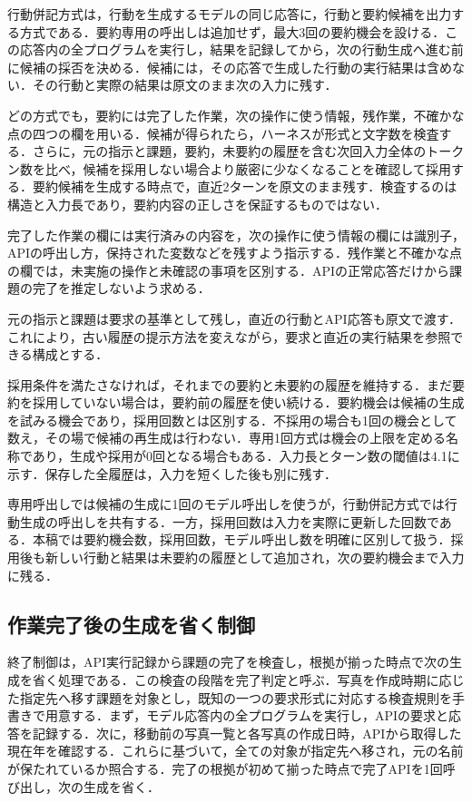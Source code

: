 \documentclass[letter]{ieicej}
\begin{document}
行動併記方式は，行動を生成するモデルの同じ応答に，行動と要約候補を出力する方式である．要約専用の呼出しは追加せず，最大3回の要約機会を設ける．この応答内の全プログラムを実行し，結果を記録してから，次の行動生成へ進む前に候補の採否を決める．候補には，その応答で生成した行動の実行結果は含めない．その行動と実際の結果は原文のまま次の入力に残す．

どの方式でも，要約には完了した作業，次の操作に使う情報，残作業，不確かな点の四つの欄を用いる．候補が得られたら，ハーネスが形式と文字数を検査する．さらに，元の指示と課題，要約，未要約の履歴を含む次回入力全体のトークン数を比べ，候補を採用しない場合より厳密に少なくなることを確認して採用する．要約候補を生成する時点で，直近2ターンを原文のまま残す．検査するのは構造と入力長であり，要約内容の正しさを保証するものではない．

完了した作業の欄には実行済みの内容を，次の操作に使う情報の欄には識別子，APIの呼出し方，保持された変数などを残すよう指示する．残作業と不確かな点の欄では，未実施の操作と未確認の事項を区別する．APIの正常応答だけから課題の完了を推定しないよう求める．

元の指示と課題は要求の基準として残し，直近の行動とAPI応答も原文で渡す．これにより，古い履歴の提示方法を変えながら，要求と直近の実行結果を参照できる構成とする．

採用条件を満たさなければ，それまでの要約と未要約の履歴を維持する．まだ要約を採用していない場合は，要約前の履歴を使い続ける．要約機会は候補の生成を試みる機会であり，採用回数とは区別する．不採用の場合も1回の機会として数え，その場で候補の再生成は行わない．専用1回方式は機会の上限を定める名称であり，生成や採用が0回となる場合もある．入力長とターン数の閾値は4.1に示す．保存した全履歴は，入力を短くした後も別に残す．

専用呼出しでは候補の生成に1回のモデル呼出しを使うが，行動併記方式では行動生成の呼出しを共有する．一方，採用回数は入力を実際に更新した回数である．本稿では要約機会数，採用回数，モデル呼出し数を明確に区別して扱う．採用後も新しい行動と結果は未要約の履歴として追加され，次の要約機会まで入力に残る．

\subsection{作業完了後の生成を省く制御}

終了制御は，API実行記録から課題の完了を検査し，根拠が揃った時点で次の生成を省く処理である．この検査の段階を完了判定と呼ぶ．写真を作成時期に応じた指定先へ移す課題を対象とし，既知の一つの要求形式に対応する検査規則を手書きで用意する．まず，モデル応答内の全プログラムを実行し，APIの要求と応答を記録する．次に，移動前の写真一覧と各写真の作成日時，APIから取得した現在年を確認する．これらに基づいて，全ての対象が指定先へ移され，元の名前が保たれているか照合する．完了の根拠が初めて揃った時点で完了APIを1回呼び出し，次の生成を省く．
\end{document}
